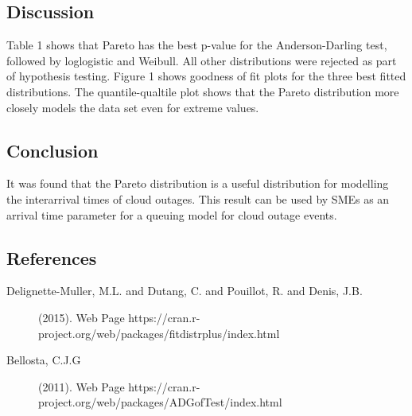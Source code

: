 \documentclass[12pt,a4paper]{article}
\begin{document}
\vspace{-8mm}

\subsection*{Discussion}
Table 1 shows that Pareto has the best p-value for the Anderson-Darling test, followed by loglogistic and Weibull. All other distributions were rejected as part of hypothesis testing. Figure 1 shows goodness of fit plots for the three best fitted distributions. The quantile-qualtile plot shows that the Pareto distribution more closely models the data set even for extreme values.


\subsection*{Conclusion}

It was found that the Pareto distribution is a useful distribution for modelling the interarrival times of cloud outages. This result can be used by SMEs as an arrival time parameter for a queuing model for cloud outage events. 

\subsection*{References}
\small
\begin{description}
\item[Delignette-Muller, M.L. and Dutang, C. and Pouillot, R. and Denis, J.B.] (2015). 
	Web Page https://cran.r-project.org/web/packages/fitdistrplus/index.html
\item[Bellosta, C.J.G] (2011).
	Web Page https://cran.r-project.org/web/packages/ADGofTest/index.html
\end{description}
\end{document}
